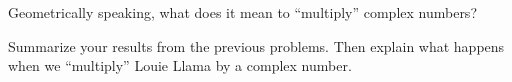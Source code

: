 \begin{prob} 
Geometrically speaking, what does it mean to ``multiply'' complex
numbers?
\end{prob}



\begin{prob}
Summarize your results from the previous problems.  
Then explain what happens when we ``multiply'' Louie Llama by a complex
number. 
\end{prob}
